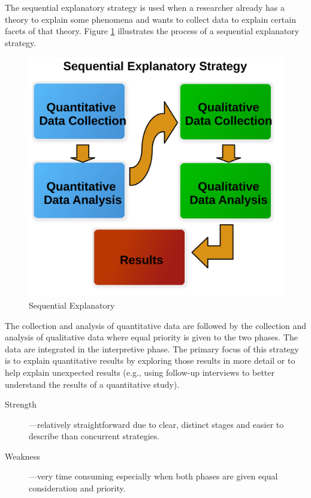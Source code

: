 The sequential explanatory strategy is used when a researcher already has a theory to explain some phenomena and wants to collect data to explain certain facets of that theory. Figure \ref{14:fig90} illustrates the process of a sequential explanatory strategy. 

\begin{figure}[H]
	\centering
	\includegraphics[width=\maxwidth{.95\linewidth}]{gfx/14-Seq_Explain}
	\caption{Sequential Explanatory}
	\label{14:fig90}
\end{figure}

The collection and analysis of quantitative data are followed by the collection and analysis of qualitative data where equal priority is given to the two phases. The data are integrated in the interpretive phase. The primary focus of this strategy is to explain quantitative results by exploring those results in more detail or to help explain unexpected results (e.g., using follow-up interviews to better understand the results of a quantitative study).

\begin{description}
	\item[Strength]---relatively straightforward due to clear, distinct stages and easier to describe than concurrent strategies.

	\item[Weakness]---very time consuming especially when both phases are given equal consideration and priority.
\end{description}

